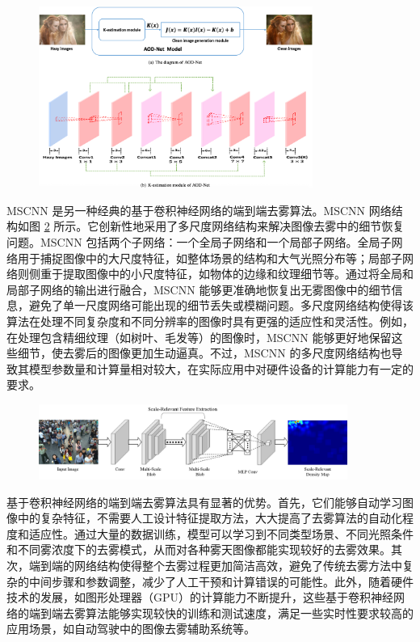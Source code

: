 \begin{figure}[ht]
    \centering
    \includegraphics[width=0.8\textwidth]{../figure/aodnet.png}
    \captionsetup{font=footnotesize}
    \label{fig:aodnet}
\end{figure}

MSCNN\cite{zeng2017multi} 是另一种经典的基于卷积神经网络的端到端去雾算法。MSCNN 网络结构如图 \ref{fig:mscnn} 所示。它创新性地采用了多尺度网络结构来解决图像去雾中的细节恢复问题。MSCNN 包括两个子网络：一个全局子网络和一个局部子网络。全局子网络用于捕捉图像中的大尺度特征，如整体场景的结构和大气光照分布等；局部子网络则侧重于提取图像中的小尺度特征，如物体的边缘和纹理细节等。通过将全局和局部子网络的输出进行融合，MSCNN 能够更准确地恢复出无雾图像中的细节信息，避免了单一尺度网络可能出现的细节丢失或模糊问题。多尺度网络结构使得该算法在处理不同复杂度和不同分辨率的图像时具有更强的适应性和灵活性。例如，在处理包含精细纹理（如树叶、毛发等）的图像时，MSCNN 能够更好地保留这些细节，使去雾后的图像更加生动逼真。不过，MSCNN 的多尺度网络结构也导致其模型参数量和计算量相对较大，在实际应用中对硬件设备的计算能力有一定的要求。

\begin{figure}[ht]
    \centering
    \includegraphics[width=0.9\textwidth]{../figure/mscnn.png}
    \captionsetup{font=footnotesize}
    \label{fig:mscnn}
\end{figure}

基于卷积神经网络的端到端去雾算法具有显著的优势。首先，它们能够自动学习图像中的复杂特征，不需要人工设计特征提取方法，大大提高了去雾算法的自动化程度和适应性。通过大量的数据训练，模型可以学习到不同类型场景、不同光照条件和不同雾浓度下的去雾模式，从而对各种雾天图像都能实现较好的去雾效果。其次，端到端的网络结构使得整个去雾过程更加简洁高效，避免了传统去雾方法中复杂的中间步骤和参数调整，减少了人工干预和计算错误的可能性。此外，随着硬件技术的发展，如图形处理器（GPU）的计算能力不断提升，这些基于卷积神经网络的端到端去雾算法能够实现较快的训练和测试速度，满足一些实时性要求较高的应用场景，如自动驾驶中的图像去雾辅助系统等。

